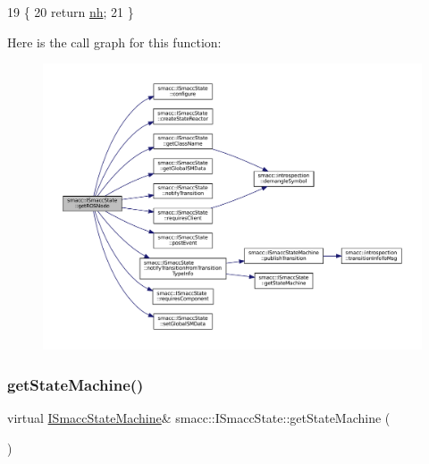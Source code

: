 \begin{DoxyCode}
19   \{
20     \textcolor{keywordflow}{return} \hyperlink{classsmacc_1_1ISmaccState_a13fe6e6abfdb87996402189d44b78494}{nh};
21   \}
\end{DoxyCode}
Here is the call graph for this function\+:
\nopagebreak
\begin{figure}[H]
\begin{center}
\leavevmode
\includegraphics[width=350pt]{classsmacc_1_1ISmaccState_a5d3f13b9d7ae7fdcf9da21c4ed935706_cgraph}
\end{center}
\end{figure}
\mbox{\label{classsmacc_1_1ISmaccState_a562bb3f9a3ac16b8be71e4794c9e7523}} 
\subsubsection{\texorpdfstring{get\+State\+Machine()}{getStateMachine()}}
{\footnotesize\ttfamily virtual \hyperlink{classsmacc_1_1ISmaccStateMachine}{I\+Smacc\+State\+Machine}\& smacc\+::\+I\+Smacc\+State\+::get\+State\+Machine (\begin{DoxyParamCaption}{ }\end{DoxyParamCaption})\hspace{0.3cm}{\ttfamily [pure virtual]}}



